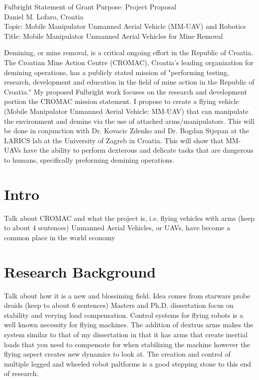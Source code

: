 \documentclass[12pt]{article}
\begin{document}
\begin{center}
\Large
Fulbright Statement of Grant Purpose: Project Proposal\\
\large
Daniel M. Lofaro, Croatia\\
Topic: Mobile Manipulator Unmanned Aerial Vehicle (MM-UAV) and Robotics\\
Title: Mobile Manipulator Unmanned Aerial Vehicles for Mine Removal\\

\end{center}

\normalsize
Demining, or mine removal, is a critical ongoing effort in the Republic of Croatia.  The Croatian Mine 
Action Centre (CROMAC), Croatia's leading organization for demining operations, has a publicly stated 
mission of "performing testing, research, development and education in the field of mine action in the 
Republic of Croatia."  My proposed Fulbright work focuses on the research and development portion 
the CROMAC mission statement.  I propose to create a flying vehicle (Mobile Manipulator Unmanned 
Aerial Vehicle: MM-UAV) that can manipulate the environment and demine via the use of attached 
arms/manipulators.  This will be done in conjunction with Dr. Kovacic Zdenko and Dr. Bogdan Stjepan 
at the LARICS lab at the University of Zagreb in Croatia.  This will show that MM-UAVs have the ability 
to perform dexterous and delicate tasks that are dangerous to humans, specifically preforming 
demining operations.

\section{Intro}
Talk about CROMAC and what the project is, i.e. flying vehicles with arms (keep to about 4 sentences)
Unmanned Aerial Vehicles, or UAVs, have become a common place in the world economy


\section{Research Background}
Talk about how it is a new and blossiming field.  Idea comes from starwars probe droids (keep to about 
6 sentences)
Masters and Ph.D. dissertation focus on stability and verying load compensation.  Control systems for flying 
robots is a  well known necessity for flying machines.  The addition of dextrus arms makes the system similar 
to that of my dissertation in that it has arms that create inertial loads that you need to compensate for when 
stabilizing the machine however the flying aspect creates new dynamics to look at.  The creation and control 
of multiple legged and wheeled robot paltforms is a good stepping stone to this end of research.  
\end{document}
